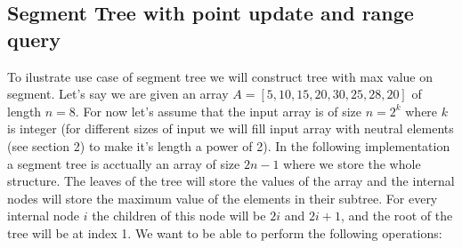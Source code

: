 \documentclass{article}
\begin{document}
\subsection{Segment Tree with point update and range query}
To ilustrate use case of segment tree we will construct tree with max value on segment.
Let's say we are given an array \(A = [5, 10, 15, 20, 30, 25, 28, 20]\) of length \(n = 8\).
For now let's assume that the input array is of size \(n = 2^{k}\) where \(k\) is integer (for different
sizes of input we will fill input array with neutral elements (see section 2) to make it's length a power of 2).
In the following implementation a segment tree is acctually an array of size \(2n - 1\) where we store the whole structure.
The leaves of the tree will store the values of the array and the internal nodes will store the maximum value of the elements in their subtree.
For every internal node \(i\) the children of this node will be \(2i\) and \(2i + 1\), and the root of the tree will be at index 1.
We want to be able to perform the following operations:
\end{document}
